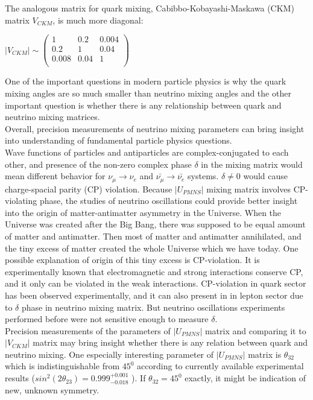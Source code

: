 The analogous matrix for quark mixing, Cabibbo-Kobayashi-Maskawa (CKM) matrix $V_{CKM}$, is much more diagonal:\\
\begin{center}
$|V_{CKM}| \sim
 \begin{pmatrix}
  1 & 0.2 & 0.004 \\ 0.2 & 1 & 0.04 \\ 0.008 & 0.04 & 1 \\
 \end{pmatrix}$\\
\end{center}

One of the important questions in modern particle physics is why the quark mixing angles are so much smaller than neutrino mixing angles and the other important question is whether there is any relationship between quark and neutrino mixing matrices.\\

Overall, precision measurements of neutrino mixing parameters can bring insight into understanding of fundamental particle physics questions.\\

Wave functions of particles and antiparticles are complex-conjugated to each other, and presence of the non-zero complex phase $\delta$ in the mixing matrix would mean different behavior for $\nu_\mu \rightarrow \nu_e$ and $\bar{\nu_\mu} \rightarrow \bar{\nu_e}$ systems. $\delta \neq 0$ would cause charge-spacial parity (CP) violation. Because $|U_{PMNS}|$ mixing matrix involves CP-violating phase, the studies of neutrino oscillations could provide better insight into the origin of matter-antimatter asymmetry in the Universe. When the Universe was created after the Big Bang, there was supposed to be equal amount of matter and antimatter. Then most of matter and antimatter annihilated, and the tiny excess of matter created the whole Universe which we have today. One possible explanation of origin of this tiny excess is CP-violation. It is experimentally known that electromagnetic and strong interactions conserve CP, and it only can be violated in the weak interactions. CP-violation in quark sector has been observed experimentally, and it can also present in in lepton sector due to $\delta$ phase in neutrino mixing matrix. But neutrino oscillations experiments performed before were not sensitive enough to measure $\delta$.\\

Precision measurements of the parameters of $|U_{PMNS}|$ matrix and comparing it to $|V_{CKM}|$ matrix may bring insight whether there is any relation between quark and neutrino mixing. One especially interesting parameter of $|U_{PMNS}|$ matrix is $\theta_{32}$ which is indistinguishable from $45^0$ according to currently available experimental results ($sin^2(2\theta_{23})=0.999^{+0.001}_{-0.018}$ \cite{ref_PDG}). If $\theta_{32}=45^0$ exactly, it might be indication of new, unknown symmetry.\\

